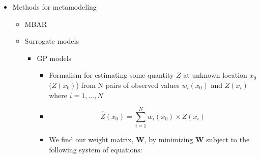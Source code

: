 \documentclass[aps,pre,nofootinbib,superscriptaddress,linenumbers,10pt, draft,tightenlines]{revtex4-1}
\begin{document}
\begin{itemize}
\begin{itemize}
    \end{itemize}
    \item Methods for metamodeling
    \begin{itemize}
    	\item MBAR
    	\item Surrogate models
    	\begin{itemize}
            \item GP models
            \begin{itemize}
            	\item Formalism for estimating some quantity $Z$ at
            	      unknown location $x_0$ ($Z\left(x_0\right)$) 
            	      from N pairs of observed values 
            	      $w_i\left(x_0\right)$ and $Z\left(x_i\right)$ where
            	      $i = 1,...,N$
                \item \begin{equation} \hat{Z}\left(x_0\right) =
                      \sum_{i=1}^N w_i\left(x_0\right) \times
                      Z\left(x_i\right) \end{equation}
                \item We find our weight matrix, \textbf{W}, by minimizing \textbf{W} subject to the following system of equations:

\end{itemize}
\end{itemize}
\end{itemize}
\end{itemize}
\end{document}
